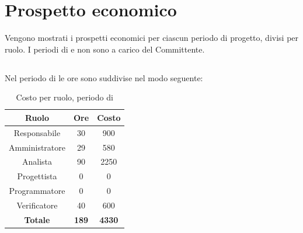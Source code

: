 \section{Prospetto economico}
Vengono mostrati i prospetti economici per ciascun periodo di progetto, divisi per ruolo. I periodi di \AR{} e \AD{} non sono a carico del Committente.

\subsection{\AR}
Nel periodo di \AR{} le ore sono suddivise nel modo seguente:
\begin{table}[H]
	\centering
	\begin{tabular}{|c|c|c|}
		\hline
		\textbf{Ruolo} &
		\textbf{Ore} &
		\textbf{Costo} \\
		\hline
		Responsabile & 30 & 900\\
		\hline
		Amministratore & 29 & 580\\
		\hline
		Analista & 90 & 2250\\
		\hline
		Progettista & 0 & 0 \\
		\hline
		Programmatore & 0 & 0 \\
		\hline
		Verificatore & 40 & 600\\
		\hline
		\textbf{Totale} & \textbf{189} & \textbf{4330} \\
		\hline
	\end{tabular}
	\caption{Costo per ruolo, periodo di \AR}
\end{table}

